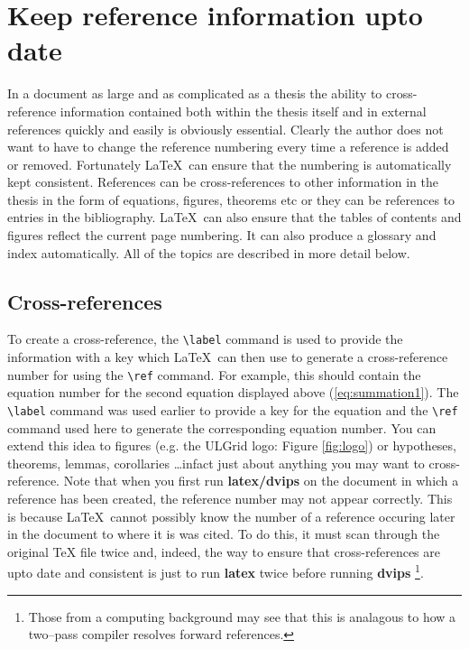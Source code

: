 \documentclass[11pt,oneside]{book}
\begin{document}
\section{Keep reference information upto date }

In a document as large and as complicated as a thesis the ability to
cross-reference information contained both within the thesis itself
and in external references quickly and easily is obviously essential.
Clearly the author does not want to have to change the reference
numbering every time a reference is added or removed. Fortunately
\LaTeX \ can ensure that the numbering is automatically kept
consistent. References can be cross-references to other information
in the thesis in the form of equations, figures, theorems etc
or they can be references to entries in the bibliography. \LaTeX \ can
also ensure that the tables of contents and figures reflect the current
page numbering. It can also produce a glossary and index automatically. All
of the topics are described in more detail below.

\subsection{Cross-references}
To create
a cross-reference, the
\verb+\label+ command is used to provide the information
with a key which \LaTeX \ can then use to generate a cross-reference
number for using the
\verb+\ref+ command. For example, this should
contain the equation number for the second equation displayed above (\ref{eq:summation1}).
The \verb+\label+ command was used earlier to provide a key for the equation
and the \verb+\ref+ command used here to generate the corresponding equation number.
You can extend this idea to figures (e.g. the ULGrid logo: Figure \ref{fig:logo})
or hypotheses, theorems, lemmas, corollaries \ldots infact just about
anything you may want to cross-reference. Note that when you first run
{\bf latex/dvips} on the document in which a reference has been created, the
reference number may not appear correctly. This is because \LaTeX \ cannot
possibly know the number of a reference occuring later in the document to
where it is was cited. To do this, it must scan through the original TeX
file twice and, indeed, the way to ensure that cross-references are upto date
and consistent is just to run {\bf latex} twice before running {\bf dvips}
\footnote{Those from a computing background may see that this is analagous
to how a two--pass compiler resolves forward references.}.
\end{document}
